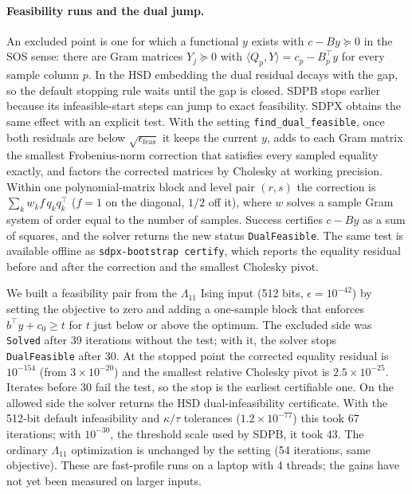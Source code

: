 \documentclass[11pt]{article}
\newcommand{\code}[1]{\texttt{#1}}
\begin{document}
\paragraph{Feasibility runs and the dual jump.}
An excluded point is one for which a functional $y$ exists with
$c - By \succeq 0$ in the SOS sense: there are Gram matrices
$Y_j \succeq 0$ with $\langle Q_p, Y\rangle = c_p - B_p^\top y$ for every
sample column $p$. In the HSD embedding the dual residual decays with the
gap, so the default stopping rule waits until the gap is closed. SDPB stops
earlier because its infeasible-start steps can jump to exact feasibility.
SDPX obtains the same effect with an explicit test. With the setting
\code{find\_dual\_feasible}, once both residuals are below
$\sqrt{\epsilon_{\mathrm{feas}}}$ it keeps the current $y$, adds to each
Gram matrix the smallest Frobenius-norm correction that satisfies every
sampled equality exactly, and factors the corrected matrices by Cholesky at
working precision. Within one polynomial-matrix block and level pair
$(r,s)$ the correction is $\sum_k w_k f\,q_kq_k^\top$ ($f=1$ on the
diagonal, $1/2$ off it), where $w$ solves a sample Gram system of order
equal to the number of samples. Success certifies $c-By$ as a sum of
squares, and the solver returns the new status \code{DualFeasible}. The
same test is available offline as \code{sdpx-bootstrap certify}, which
reports the equality residual before and after the correction and the
smallest Cholesky pivot.

We built a feasibility pair from the $\Lambda_{11}$ Ising input (512 bits,
$\epsilon = 10^{-42}$) by setting the objective to zero and adding a
one-sample block that enforces $b^\top y + c_0 \ge t$ for $t$ just below or
above the optimum. The excluded side was \code{Solved} after 39 iterations
without the test; with it, the solver stops \code{DualFeasible} after 30.
At the stopped point the corrected equality residual is $10^{-154}$ (from
$3\times10^{-20}$) and the smallest relative Cholesky pivot is
$2.5\times10^{-25}$. Iterates before 30 fail the test, so the stop is the
earliest certifiable one. On the allowed side the solver returns the HSD
dual-infeasibility certificate. With the 512-bit default infeasibility and
$\kappa/\tau$ tolerances ($1.2\times10^{-77}$) this took 67 iterations; with
$10^{-30}$, the threshold scale used by SDPB, it took 43. The ordinary
$\Lambda_{11}$ optimization is unchanged by the setting (54 iterations,
same objective). These are fast-profile runs on a laptop with 4 threads;
the gains have not yet been measured on larger inputs.
\end{document}
